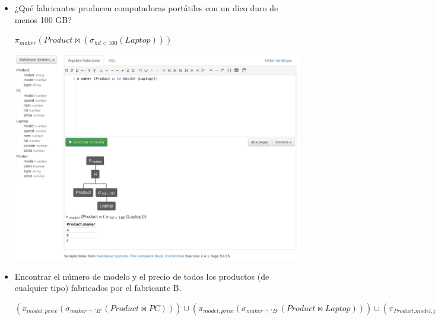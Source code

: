 \documentclass[12pt, letterpaper]{article}
\begin{document}
\begin{itemize}
\begin{itemize}
                \item[\textbf{b.}]  ¿Qué fabricantes producen computadoras 
                                    portátiles con un dico duro de menos 100 GB?
                                    
                                    \begin{center}
                                        $\pi_{maker}(Product \Join (\sigma_{hd < 100} (Laptop)))$\vspace{.3cm}

                                        \includegraphics[scale=0.3]{b.png}
                                    \end{center}
                
                                    \newpage
                \item[\textbf{c.}]  Encontrar el número de modelo y el precio de 
                                    todos los productos (de cualquier tipo) 
                                    fabricados por el fabricante B.

                                    \begin{center}
                                        $(\pi_{model,price}(\sigma_{maker = 'B'} (Product \Join PC))) \cup (\pi_{model,price}(\sigma_{maker = 'B'} (Product \Join Laptop))) 
                                        \cup (\pi_{Product.model,price}(\sigma_{maker = 'B'} (Product \Join_{Product.model = Printer.model} Printer)))$\vspace{.3cm}


\end{center}
\end{itemize}
\end{itemize}
\end{document}
